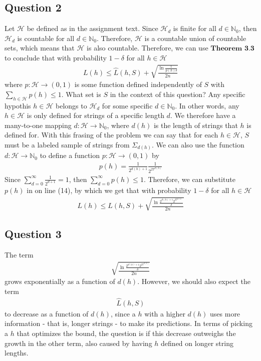 \subsection{Question 2}
Let $\mathcal{H}$ be defined as in the assignment text. Since $\mathcal{H}_d$ is finite for all $d\in \mathbb{N}_0$, then $\mathcal{H}_d$ is countable for all $d\in \mathbb{N}_0$. Therefore, $\mathcal{H}$ is a countable union of countable sets, which means that $\mathcal{H}$ is also countable. Therefore, we can use $\textbf{Theorem 3.3}$ to conclude that with probability $1 - \delta$ for all $h \in \mathcal{H}$
\begin{align}
L(h) \leq \hat{L}(h,S) + \sqrt{\frac{\ln \frac{1}{p(h)\delta}}{2n}}
\end{align}
where $p: \mathcal{H} \to (0,1)$ is some function defined independently of $S$ with $\sum_{h \in \mathcal{H}}p(h) \leq 1$. What set is $S$ in the context of this question? Any specific hypothis $h\in \mathcal{H}$ belongs to $\mathcal{H}_d$ for some specific $d\in \mathbb{N}_0$. In other words, any $h\in \mathcal{H}$ is only defined for strings of a specific length $d$. We therefore have a many-to-one mapping $d: \mathcal{H} \to \mathbb{N}_0$, where $d(h)$ is the length of strings that $h$ is defined for. With this frasing of the problem we can say that for each $h\in \mathcal{H}$, $S$ must be a labeled sample of strings from $\Sigma_{d(h)}$. We can also use the function $d: \mathcal{H} \to \mathbb{N}_0$ to define a function $p: \mathcal{H} \to (0,1)$ by
\begin{align}
p(h)=\frac{1}{2^{d(h) + 1}}\frac{1}{2^{27^{d(h)}}}
\end{align}
Since $\sum_{d=0}^\infty \frac{1}{2^{d+1}}=1$, then $\sum_{d=0}^\infty p(h) \leq 1$. Therefore, we can substitute $p(h)$ in on line (14), by which we get that with probability $1 - \delta$ for all $h \in \mathcal{H}$
\begin{align}
L(h) \leq \hat{L}(h,S) + \sqrt{\frac{\ln \frac{2^{d(h) + 1} 2^{27^{d(h)}}}{\delta}}{2n}}
\end{align}

\subsection{Question 3}
The term 
\begin{align}
\sqrt{\frac{\ln \frac{2^{d(h) + 1} 2^{27^{d(h)}}}{\delta}}{2n}}
\end{align}
grows exponentially as a function of $d(h)$. However, we should also expect the term 
\begin{align}
\hat{L}(h,S) 
\end{align}
to decrease as a function of $d(h)$, since a $h$ with a higher $d(h)$ uses more information - that is, longer strings - to make its predictions. In terms of picking a $h$ that optimizes the bound, the question is if this decrease outweighs the growth in the other term, also caused by having $h$ defined on longer string lengths.